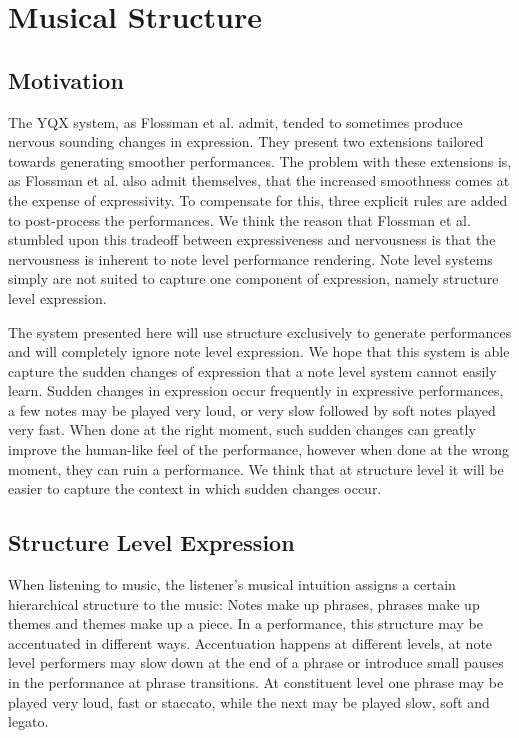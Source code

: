 \documentclass[a4paper,10pt]{article}
\begin{document}
\section{Musical Structure}
\label{sec:structure}
\subsection{Motivation}

The YQX system, as Flossman et al. admit, tended to sometimes produce nervous sounding changes in expression. They present two extensions tailored towards generating smoother performances. The problem with these extensions is, as Flossman et al. also admit themselves, that the increased smoothness comes at the expense of expressivity. To compensate for this, three explicit rules are added to post-process the performances. We think the reason that Flossman et al. stumbled upon this tradeoff between expressiveness and nervousness is that the nervousness is inherent to note level performance rendering. Note level systems simply are not suited to capture one component of expression, namely structure level expression. 


The system presented here will use structure exclusively to generate performances and will completely ignore note level expression. We hope that this system is able capture the sudden changes of expression that a note level system cannot easily learn. Sudden changes in expression occur frequently in expressive performances, a few notes may be played very loud, or very slow followed by soft notes played very fast. When done at the right moment, such sudden changes can greatly improve the human-like feel of the performance, however when done at the wrong moment, they can ruin a performance. We think that at structure level it will be easier to capture the context in which sudden changes occur. 




\subsection{Structure Level Expression}
When listening to music, the listener's musical intuition assigns a certain hierarchical structure to the music: Notes make up phrases, phrases make up themes and themes make up a piece. In a performance, this structure may be accentuated in different ways. Accentuation happens at different levels, at note level performers may slow down at the end of a phrase or introduce small pauses in the performance at phrase transitions. At constituent level one phrase may be played very loud, fast or staccato, while the next may be played slow, soft and legato. 
\end{document}
